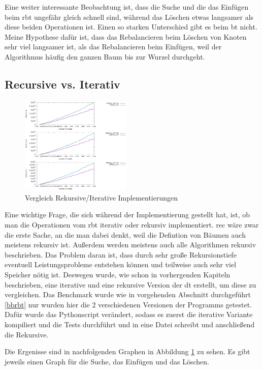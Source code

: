\documentclass[11pt]{article}
\begin{document}
Eine weiter interessante Beobachtung ist, dass die Suche und die das Einfügen beim \gls{rbt} ungefähr gleich schnell sind, während das Löschen etwas langsamer als diese beiden Operationen ist.
Einen so starken Unterschied gibt es beim \gls{bt} nicht. Meine Hypothese dafür ist, dass das Rebalancieren beim Löschen von Knoten sehr viel langsamer ist, als das Rebalancieren beim Einfügen, weil
der Algorithmus häufig den ganzen Baum bis zur Wurzel durchgeht. 

\subsection{Recursive vs. Iterativ}

\begin{figure}
  \centering
  \includegraphics[width=200px]{../benchmark/compare_insert.png}
  \caption{Vergleich Rekursive/Iterative Implementierungen}
  \label{bir}
\end{figure}

Eine wichtige Frage, die sich während der Implementierung gestellt hat, ist, ob man die Operationen vom \gls{rbt} iterativ oder rekursiv implementiert. 
\gls{rec} wäre zwar die erste Sache, an die man dabei denkt, weil die Defintion von Bäumen auch meistens rekursiv ist. Außerdem werden meistens auch alle Algorithmen rekursiv beschrieben. 
Das Problem daran ist, dass durch sehr große Rekursionstiefe eventuell Leistungsprobleme entstehen können und teilweise auch sehr viel Speicher nötig ist. 
Deswegen wurde, wie schon in vorhergenden Kapiteln beschrieben, eine iterative und eine rekursive Version der \gls{dt} erstellt, um diese zu vergleichen.
Das Benchmark wurde wie in vorgehenden Abschnitt durchgeführt \ref{bbrbt} nur wurden hier die 2 verschiedenen Versionen der Programms getestet. 
Dafür wurde das Pythonscript verändert, sodass es zuerst die iterative Variante kompiliert und die Tests durchführt und in eine Datei schreibt und anschließend die Rekursive. 

Die Ergenisse sind in nachfolgenden Graphen in Abbildung \ref{bir} zu sehen. Es gibt jeweils einen Graph für die Suche, das Einfügen und das Löschen.
\end{document}
